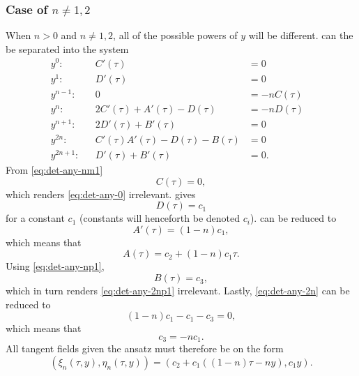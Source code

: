 \subsubsection{Case of \texorpdfstring{\(n\neq1,2\)}{n not 1 or 2}}

When \(n>0\) and \(n\neq1,2\), all of the possible powers of \(y\) will be different.
 can the be separated into the system
\begin{subequations}
  \begin{flalign}
    y^0:      && C'(\tau) &= 0                               &\label{eq:det-any-0}\\
    y^1:      && D'(\tau) &= 0                               &\label{eq:det-any-1} \\
    y^{n-1}:  && 0 &= -nC(\tau)                              &\label{eq:det-any-nm1} \\
    y^n:      && 2C'(\tau) + A'(\tau) - D(\tau) &= -nD(\tau) &\label{eq:det-any-n} \\
    y^{n+1}:  && 2D'(\tau) + B'(\tau) &= 0                   &\label{eq:det-any-np1} \\
    y^{2n}:   && C'(\tau) A'(\tau) - D(\tau) - B(\tau) &= 0  &\label{eq:det-any-2n} \\
    y^{2n+1}: && D'(\tau) + B'(\tau) &= 0.                   &\label{eq:det-any-2np1}
  \end{flalign}
\end{subequations}
From \cref{eq:det-any-nm1}
\begin{equation*}
  C(\tau) = 0,
\end{equation*}
which renders \cref{eq:det-any-0} irrelevant.
 gives
\begin{equation*}
  D(\tau) = c_1
\end{equation*}
for a constant \(c_1\) (constants will henceforth be denoted \(c_i\)).
 can be reduced to
\begin{equation*}
  A'(\tau) = (1-n) c_1,
\end{equation*}
which means that
\begin{equation*}
  A(\tau) = c_2 + (1-n) c_1 \tau.
\end{equation*}
Using \cref{eq:det-any-np1},
\begin{equation*}
  B(\tau) = c_3,
\end{equation*}
which in turn renders \cref{eq:det-any-2np1} irrelevant.
Lastly, \cref{eq:det-any-2n} can be reduced to
\begin{equation*}
  (1-n) c_1 - c_1 - c_3 = 0,
\end{equation*}
which means that
\begin{equation*}
  c_3 = -n c_1.
\end{equation*}
All tangent fields given the ansatz must therefore be on the form
\begin{equation} \label{eq:hill-tangent-field-any}
  \left(\xi_n(\tau,y),\eta_n(\tau,y)\right) = 
  \left(c_2 + c_1 \left( (1-n) \tau - n y \right), c_1 y\right).
\end{equation}

